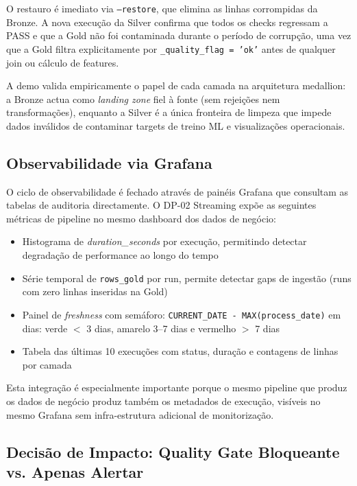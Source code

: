 \documentclass[11pt,a4paper]{article}
\begin{document}
O restauro é imediato via \texttt{--restore}, que elimina as linhas corrompidas da Bronze. A nova execução da Silver confirma que todos os checks regressam a PASS e que a Gold não foi contaminada durante o período de corrupção, uma vez que a Gold filtra explicitamente por \texttt{\_quality\_flag = 'ok'} antes de qualquer join ou cálculo de features.

A demo valida empiricamente o papel de cada camada na arquitetura medallion: a Bronze actua como \textit{landing zone} fiel à fonte (sem rejeições nem transformações), enquanto a Silver é a única fronteira de limpeza que impede dados inválidos de contaminar targets de treino ML e visualizações operacionais.

\subsection{Observabilidade via Grafana}

O ciclo de observabilidade é fechado através de painéis Grafana que consultam as tabelas de auditoria directamente. O DP-02 Streaming expõe as seguintes métricas de pipeline no mesmo dashboard dos dados de negócio:

\begin{itemize}[leftmargin=*,noitemsep]
  \item Histograma de \textit{duration\_seconds} por execução, permitindo detectar degradação de performance ao longo do tempo
  \item Série temporal de \texttt{rows\_gold} por run, permite detectar gaps de ingestão (runs com zero linhas inseridas na Gold)
  \item Painel de \textit{freshness} com semáforo: \texttt{CURRENT\_DATE - MAX(process\_date)} em dias: verde $<$ 3 dias, amarelo 3--7 dias e vermelho $>$ 7 dias
  \item Tabela das últimas 10 execuções com status, duração e contagens de linhas por camada
\end{itemize}

Esta integração é especialmente importante porque o mesmo pipeline que produz os dados de negócio produz também os metadados de execução, visíveis no mesmo Grafana sem infra-estrutura adicional de monitorização.

\subsection{Decisão de Impacto: Quality Gate Bloqueante vs. Apenas Alertar}
\end{document}
